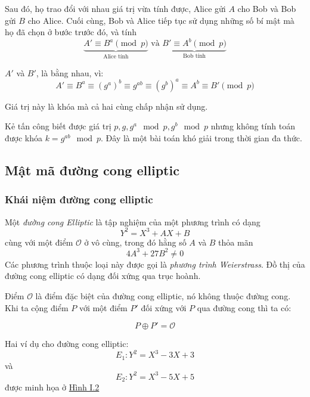 Sau đó, họ trao đổi với nhau giá trị vừa tính được, Alice gửi $A$ cho Bob và Bob gửi $B$ cho Alice. 
Cuối cùng, Bob và Alice tiếp tục sử dụng những số bí mật mà họ đã chọn ở bước trước đó, và tính
$$\underbrace{A' \equiv B^a \pmod{p}}_{\text{Alice tính}} \text{ và } \underbrace{B' \equiv A^b \pmod{p}}_{\text{Bob tính}}$$

$A'$ và $B'$, là bằng nhau, vì:
$$A' \equiv B^a \equiv (g^a)^b \equiv g^{ab} \equiv (g^b)^a \equiv A^b \equiv B' \pmod{p}$$

Giá trị này là khóa mà cả hai cùng chấp nhận sử dụng.

Kẻ tấn công biết được giá trị $p,g,g^a \mod p, g^b \mod p $ nhưng không 
tính toán được khóa $k = g^{ab} \mod p$. Đây là một bài toán khó giải 
trong thời gian đa thức. \cite{elliptic}

\subsection{Mật mã đường cong elliptic}
\subsubsection{Khái niệm đường cong elliptic}

Một \textit{đường cong Elliptic} là tập nghiệm của một phương trình có dạng
$$Y^2 = X^3 + AX + B$$ cùng với một điểm $\mathcal{O}$ ở vô cùng, trong đó hằng số $A$ và $B$ thỏa mãn
$$ 4A^3 + 27B^2 \neq 0$$
Các phương trình thuộc loại này được gọi là \textit{phương trình Weierstrass}. 
Đồ thị của đường cong elliptic có dạng đối xứng qua trục hoành. \cite{elliptic}

Điểm $\mathcal{O}$ là điểm đặc biệt của đường cong elliptic, nó không thuộc đường cong.
Khi ta cộng điểm $P$ với một điểm $P'$ đối xứng với $P$ qua đường cong thì ta có:

$$ P \oplus P' = \mathcal{O}$$

Hai ví dụ cho đường cong elliptic:
$$ E_1: Y^2=X^3-3X+3 $$ và $$ E_2: Y^2=X^3-5X+5 $$ được minh họa ở \hyperref[fg:fg1]{Hình I.2}

